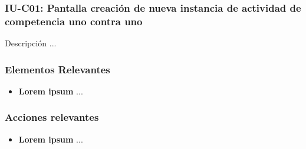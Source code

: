 
\subsubsection{IU-C01: Pantalla creación de nueva instancia de actividad de competencia uno contra uno}

 Descripción ...


\subsubsection{Elementos Relevantes}

    \begin{itemize}
    \item {\bf Lorem ipsum}
        ...
    \end{itemize}

\subsubsection{Acciones relevantes}

    \begin{itemize}
    \item {\bf Lorem ipsum}
        ...
    \end{itemize}

\clearpage

